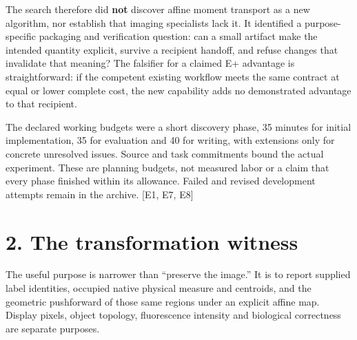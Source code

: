 \documentclass[10pt,a4paper]{article}
\begin{document}
The search therefore did \textbf{not} discover affine moment transport
as a new algorithm, nor establish that imaging specialists lack it. It
identified a purpose-specific packaging and verification question: can a
small artifact make the intended quantity explicit, survive a recipient
handoff, and refuse changes that invalidate that meaning? The falsifier
for a claimed E+ advantage is straightforward: if the competent existing
workflow meets the same contract at equal or lower complete cost, the
new capability adds no demonstrated advantage to that recipient.

The declared working budgets were a short discovery phase, 35 minutes
for initial implementation, 35 for evaluation and 40 for writing, with
extensions only for concrete unresolved issues. Source and task
commitments bound the actual experiment. These are planning budgets, not
measured labor or a claim that every phase finished within its
allowance. Failed and revised development attempts remain in the
archive. {[}E1, E7, E8{]}

\clearpage

\hypertarget{the-transformation-witness}{%
\section{2. The transformation
witness}\label{the-transformation-witness}}

The useful purpose is narrower than ``preserve the image.'' It is to
report supplied label identities, occupied native physical measure and
centroids, and the geometric pushforward of those same regions under an
explicit affine map. Display pixels, object topology, fluorescence
intensity and biological correctness are separate purposes.
\end{document}
